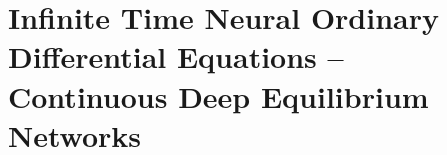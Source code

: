\chapter{Infinite Time Neural Ordinary Differential Equations -- Continuous Deep Equilibrium Networks}
\label{chapter:infinite_time_neural_odes}